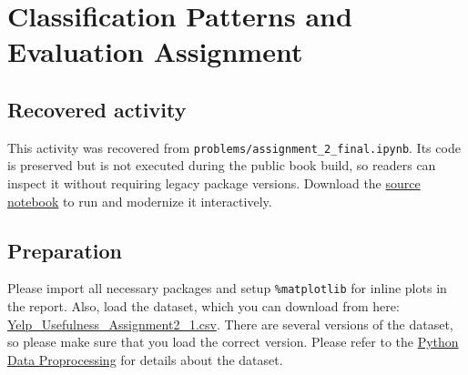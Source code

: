 \documentclass[
  letterpaper,
]{scrbook}
\begin{document}
\chapter*{Classification Patterns and Evaluation
Assignment}\label{ch-lab-classification-patterns-assignment}


\section*{Recovered
activity}\label{sec-lab-classification-patterns-assignment}


\begin{tcolorbox}[enhanced jigsaw, arc=.35mm, bottomrule=.15mm, bottomtitle=1mm, breakable, colback=white, colbacktitle=quarto-callout-note-color!10!white, colframe=quarto-callout-note-color-frame, coltitle=black, left=2mm, leftrule=.75mm, opacityback=0, opacitybacktitle=0.6, rightrule=.15mm, title=\textcolor{quarto-callout-note-color}{\faInfo}\hspace{0.5em}{Historical source and execution note}, titlerule=0mm, toprule=.15mm, toptitle=1mm]

This activity was recovered from
\texttt{problems/assignment\_2\_final.ipynb}. Its code is preserved but
is not executed during the public book build, so readers can inspect it
without requiring legacy package versions. Download the
\href{../notebooks/classification-patterns-assignment.ipynb}{source
notebook} to run and modernize it interactively.

\end{tcolorbox}

\section*{Preparation}\label{preparation-1}


Please import all necessary packages and setup \texttt{\%matplotlib} for
inline plots in the report. Also, load the dataset, which you can
download from here:
\href{../data/Yelp_Usefulness_Assignment2_1.csv}{Yelp\_Usefulness\_Assignment2\_1.csv}.
There are several versions of the dataset, so please make sure that you
load the correct version. Please refer to the
\hyperref[sec-lab-data-preprocessing]{Python Data Proprocessing} for
details about the dataset.
\end{document}
